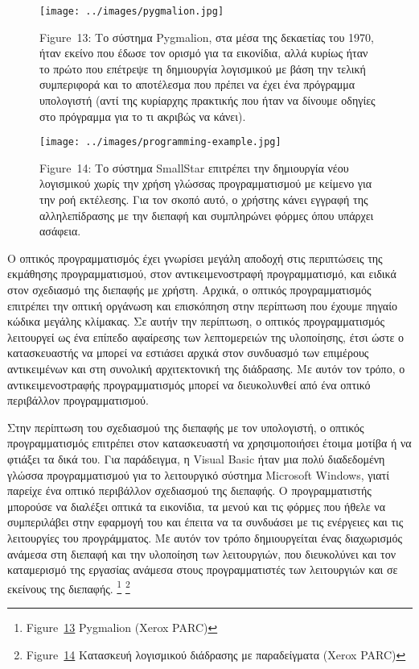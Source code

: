 \documentclass[
]{article}
\begin{document}
\leavevmode{}%
\begin{figure}
\hypertarget{fig:pygmalion}{%
\centering
\texttt{[image: ../images/pygmalion.jpg]}
\caption{Figure~13: Το σύστημα Pygmalion, στα μέσα της δεκαετίας του
1970, ήταν εκείνο που έδωσε τον ορισμό για τα εικονίδια, αλλά κυρίως
ήταν το πρώτο που επέτρεψε τη δημιουργία λογισμικού με βάση την τελική
συμπεριφορά και το αποτέλεσμα που πρέπει να έχει ένα πρόγραμμα
υπολογιστή (αντί της κυρίαρχης πρακτικής που ήταν να δίνουμε οδηγίες στο
πρόγραμμα για το τι ακριβώς να κάνει).}\label{fig:pygmalion}
}
\end{figure}

\leavevmode{}%
\begin{figure}
\hypertarget{fig:programming-example}{%
\centering
\texttt{[image: ../images/programming-example.jpg]}
\caption{Figure~14: Το σύστημα SmallStar επιτρέπει την δημιουργία νέου
λογισμικού χωρίς την χρήση γλώσσας προγραμματισμού με κείμενο για την
ροή εκτέλεσης. Για τον σκοπό αυτό, ο χρήστης κάνει εγγραφή της
αλληλεπίδρασης με την διεπαφή και συμπληρώνει φόρμες όπου υπάρχει
ασάφεια.}\label{fig:programming-example}
}
\end{figure}

Ο οπτικός προγραμματισμός έχει γνωρίσει μεγάλη αποδοχή στις περιπτώσεις
της εκμάθησης προγραμματισμού, στον αντικειμενοστραφή προγραμματισμό,
και ειδικά στον σχεδιασμό της διεπαφής με χρήστη. Αρχικά, ο οπτικός
προγραμματισμός επιτρέπει την οπτική οργάνωση και επισκόπηση στην
περίπτωση που έχουμε πηγαίο κώδικα μεγάλης κλίμακας. Σε αυτήν την
περίπτωση, ο οπτικός προγραμματισμός λειτουργεί ως ένα επίπεδο αφαίρεσης
των λεπτομερειών της υλοποίησης, έτσι ώστε ο κατασκευαστής να μπορεί να
εστιάσει αρχικά στον συνδυασμό των επιμέρους αντικειμένων και στη
συνολική αρχιτεκτονική της διάδρασης. Με αυτόν τον τρόπο, ο
αντικειμενοστραφής προγραμματισμός μπορεί να διευκολυνθεί από ένα οπτικό
περιβάλλον προγραμματισμού.

Στην περίπτωση του σχεδιασμού της διεπαφής με τον υπολογιστή, ο οπτικός
προγραμματισμός επιτρέπει στον κατασκευαστή να χρησιμοποιήσει έτοιμα
μοτίβα ή να φτιάξει τα δικά του. Για παράδειγμα, η Visual Basic ήταν μια
πολύ διαδεδομένη γλώσσα προγραμματισμού για το λειτουργικό σύστημα
Microsoft Windows, γιατί παρείχε ένα οπτικό περιβάλλον σχεδιασμού της
διεπαφής. Ο προγραμματιστής μπορούσε να διαλέξει οπτικά τα εικονίδια, τα
μενού και τις φόρμες που ήθελε να συμπεριλάβει στην εφαρμογή του και
έπειτα να τα συνδυάσει με τις ενέργειες και τις λειτουργίες του
προγράμματος. Με αυτόν τον τρόπο δημιουργείται ένας διαχωρισμός ανάμεσα
στη διεπαφή και την υλοποίηση των λειτουργιών, που διευκολύνει και τον
καταμερισμό της εργασίας ανάμεσα στους προγραμματιστές των λειτουργιών
και σε εκείνους της διεπαφής. \footnote{Figure~\protect\hyperlink{fig:pygmalion}{13}
  Pygmalion (Xerox PARC)} \footnote{Figure~\protect\hyperlink{fig:programming-example}{14}
  Κατασκευή λογισμικού διάδρασης με παραδείγματα (Xerox PARC)}
\end{document}
